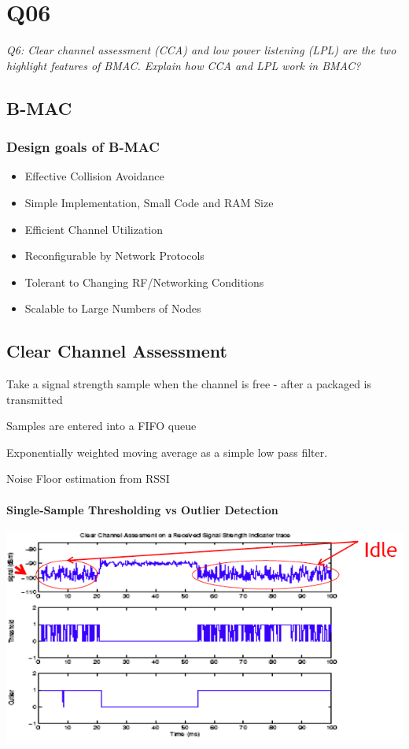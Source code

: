 \chapter{Q06}
\emph{Q6: Clear channel assessment (CCA) and low power listening (LPL) are the
two highlight features of BMAC. Explain how CCA and LPL work in BMAC?}

\section{B-MAC}
\subsection{Design goals of B-MAC}
\begin{itemize}
	\item Effective Collision Avoidance
	\item Simple Implementation, Small Code and RAM Size
	\item Efficient Channel Utilization
	\item Reconfigurable by Network Protocols
	\item Tolerant to Changing RF/Networking Conditions
	\item Scalable to Large Numbers of Nodes
\end{itemize}

\section{Clear Channel Assessment}

Take a signal strength sample when the channel is free - after a packaged is
transmitted

Samples are entered into a FIFO queue

Exponentially weighted moving average as a simple low pass filter.

Noise Floor estimation from RSSI

\subsubsection{Single-Sample Thresholding vs Outlier Detection}

\begin{center}
 \includegraphics[scale=0.5]{img/CCA-RSSI.png}
\end{center}


